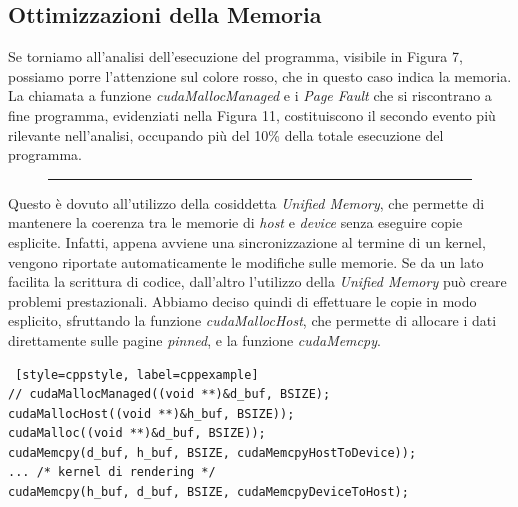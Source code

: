 \documentclass[main.tex]{subfiles}
\begin{document}
\subsection{Ottimizzazioni della Memoria}
\hspace*{0.25in}Se torniamo all'analisi dell'esecuzione del programma, visibile in Figura 7, possiamo porre l'attenzione sul colore rosso, che in questo caso indica la memoria. La chiamata 
a funzione \textit{cudaMallocManaged} e i \textit{Page Fault} che si riscontrano a fine programma, evidenziati nella Figura 11, costituiscono il secondo evento più rilevante nell'analisi, occupando più del 10\% della totale esecuzione del programma. 
\begin{figure}[h]
    \centering
    \captionsetup{aboveskip=0pt}
    \vspace{-14pt}\rule{0.65\linewidth}{0.4pt}
\end{figure}

Questo è dovuto all'utilizzo della cosiddetta \textit{Unified Memory}, che permette di mantenere la coerenza tra le memorie di \textit{host} e \textit{device} senza eseguire copie esplicite.
 Infatti, appena avviene una sincronizzazione al termine di un kernel, vengono riportate automaticamente le modifiche sulle memorie. Se da un lato facilita la scrittura di codice, dall'altro l'utilizzo della \textit{Unified Memory} può creare problemi prestazionali.  
Abbiamo deciso quindi di effettuare le copie in modo esplicito, sfruttando la funzione \textit{cudaMallocHost}, che permette di allocare i dati direttamente sulle pagine \textit{pinned}, e la funzione \textit{cudaMemcpy}. 

\begin{lstlisting} [style=cppstyle, label=cppexample]
// cudaMallocManaged((void **)&d_buf, BSIZE);
cudaMallocHost((void **)&h_buf, BSIZE));
cudaMalloc((void **)&d_buf, BSIZE));
cudaMemcpy(d_buf, h_buf, BSIZE, cudaMemcpyHostToDevice));
... /* kernel di rendering */
cudaMemcpy(h_buf, d_buf, BSIZE, cudaMemcpyDeviceToHost);
\end{lstlisting}
\end{document}
